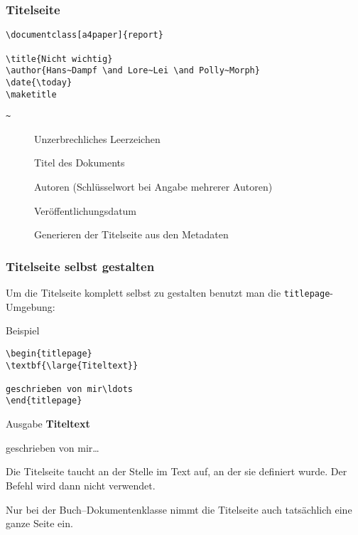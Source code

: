 \begin{frame}[c,fragile]
\frametitle{Titelseite}

\begin{block}{}
\begin{verbatim}
\documentclass[a4paper]{report}

\title{Nicht wichtig}
\author{Hans~Dampf \and Lore~Lei \and Polly~Morph}
\date{\today}
\maketitle

\end{verbatim}
\end{block}

\begin{description}
\item[\texttt{\~}] Unzerbrechliches Leerzeichen
\item[] Titel des Dokuments
\item[] Autoren (Schl\"usselwort  bei Angabe mehrerer Autoren)
\item[] Ver\"offentlichungsdatum
\item[] Generieren der Titelseite aus den Metadaten
\end{description}

\end{frame}

\begin{frame}[c,fragile]
\frametitle{Titelseite selbst gestalten}

Um die Titelseite komplett selbst zu gestalten benutzt man die \texttt{titlepage}-Umgebung:
\begin{block}{Beispiel}
\begin{verbatim}
\begin{titlepage}
\textbf{\large{Titeltext}}

geschrieben von mir\ldots
\end{titlepage}
\end{verbatim}
\end{block}

\begin{block}{Ausgabe}
\textbf{\large{Titeltext}}

geschrieben von mir\ldots
\end{block}

Die Titelseite taucht an der Stelle im Text auf, an der sie definiert wurde. Der Befehl  wird dann nicht verwendet.

Nur bei der Buch--Dokumentenklasse nimmt die Titelseite auch tats\"achlich eine ganze Seite ein.

\end{frame}

